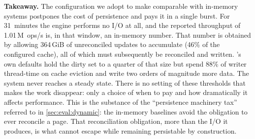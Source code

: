 \textbf{Takeaway.}
The configuration we adopt to make \project{} comparable with in-memory systems postpones the cost of persistence and pays it in a single burst.
For 31~minutes the engine performs no I/O at all, and the reported throughput of 1.01\,M~ops/s is, in that window, an in-memory number.
That number is obtained by allowing 364\,GiB of unreconciled updates to accumulate (46\% of the configured cache), all of which must subsequently be reconciled and written.
\wt{}'s own defaults hold the dirty set to a quarter of that size but spend 88\% of writer thread-time on cache eviction and write two orders of magnitude more data.
The system never reaches a steady state.
There is no setting of these thresholds that makes the work disappear: only a choice of when to pay and how dramatically it affects performance.
This is the substance of the ``persistence machinery tax'' referred to in \autoref{sec:eval:dynamic}: the in-memory baselines avoid the obligation to ever reconcile a page.
That reconciliation obligation, more than the I/O it produces, is what \project{} cannot escape while remaining persistable by construction.